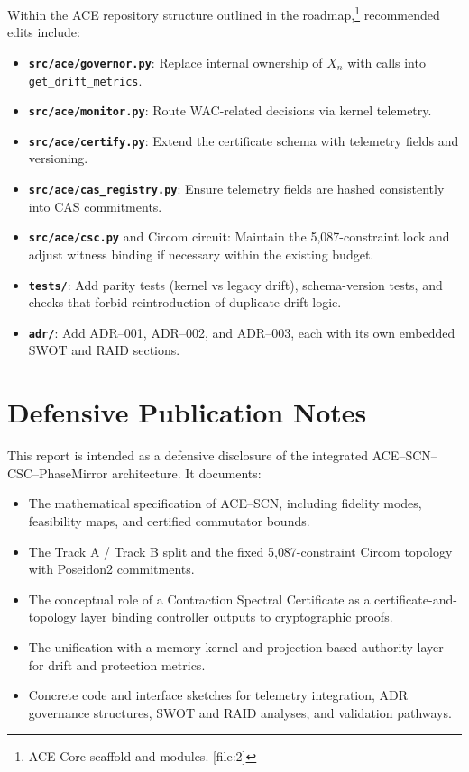 \documentclass[11pt]{article}
\begin{document}
Within the ACE repository structure outlined in the roadmap,\footnote{ACE Core scaffold and modules. [file:2]} recommended edits include:

\begin{itemize}[leftmargin=*]
  \item \textbf{\texttt{src/ace/governor.py}}: Replace internal ownership of \(X_n\) with calls into \texttt{get\_drift\_metrics}.
  \item \textbf{\texttt{src/ace/monitor.py}}: Route WAC-related decisions via kernel telemetry.
  \item \textbf{\texttt{src/ace/certify.py}}: Extend the certificate schema with telemetry fields and versioning.
  \item \textbf{\texttt{src/ace/cas\_registry.py}}: Ensure telemetry fields are hashed consistently into CAS commitments.
  \item \textbf{\texttt{src/ace/csc.py}} and Circom circuit: Maintain the 5{,}087-constraint lock and adjust witness binding if necessary within the existing budget.
  \item \textbf{\texttt{tests/}}: Add parity tests (kernel vs legacy drift), schema-version tests, and checks that forbid reintroduction of duplicate drift logic.
  \item \textbf{\texttt{adr/}}: Add ADR--001, ADR--002, and ADR--003, each with its own embedded SWOT and RAID sections.
\end{itemize}

\section{Defensive Publication Notes}

This report is intended as a defensive disclosure of the integrated ACE--SCN--CSC--PhaseMirror architecture. It documents:
\begin{itemize}[leftmargin=*]
  \item The mathematical specification of ACE--SCN, including fidelity modes, feasibility maps, and certified commutator bounds.
  \item The Track A / Track B split and the fixed 5{,}087-constraint Circom topology with Poseidon2 commitments.
  \item The conceptual role of a Contraction Spectral Certificate as a certificate-and-topology layer binding controller outputs to cryptographic proofs.
  \item The unification with a memory-kernel and projection-based authority layer for drift and protection metrics.
  \item Concrete code and interface sketches for telemetry integration, ADR governance structures, SWOT and RAID analyses, and validation pathways.
\end{itemize}
\end{document}
